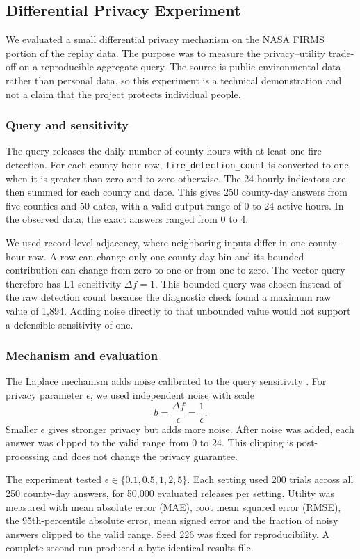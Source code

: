 \subsection{Differential Privacy Experiment}

We evaluated a small differential privacy mechanism on the NASA FIRMS portion of the replay data. The purpose was to measure the privacy--utility trade-off on a reproducible aggregate query. The source is public environmental data rather than personal data, so this experiment is a technical demonstration and not a claim that the project protects individual people.

\subsubsection{Query and sensitivity}
The query releases the daily number of county-hours with at least one fire detection. For each county-hour row, \texttt{fire\_detection\_count} is converted to one when it is greater than zero and to zero otherwise. The 24 hourly indicators are then summed for each county and date. This gives 250 county-day answers from five counties and 50 dates, with a valid output range of 0 to 24 active hours. In the observed data, the exact answers ranged from 0 to 4.

We used record-level adjacency, where neighboring inputs differ in one county-hour row. A row can change only one county-day bin and its bounded contribution can change from zero to one or from one to zero. The vector query therefore has L1 sensitivity $\Delta f=1$. This bounded query was chosen instead of the raw detection count because the diagnostic check found a maximum raw value of 1,894. Adding noise directly to that unbounded value would not support a defensible sensitivity of one.

\subsubsection{Mechanism and evaluation}
The Laplace mechanism adds noise calibrated to the query sensitivity \cite{dwork2006calibrating,dwork2014algorithmic}. For privacy parameter $\epsilon$, we used independent noise with scale
\[
b=\frac{\Delta f}{\epsilon}=\frac{1}{\epsilon}.
\]
Smaller $\epsilon$ gives stronger privacy but adds more noise. After noise was added, each answer was clipped to the valid range from 0 to 24. This clipping is post-processing and does not change the privacy guarantee.

The experiment tested $\epsilon\in\{0.1,0.5,1,2,5\}$. Each setting used 200 trials across all 250 county-day answers, for 50,000 evaluated releases per setting. Utility was measured with mean absolute error (MAE), root mean squared error (RMSE), the 95th-percentile absolute error, mean signed error and the fraction of noisy answers clipped to the valid range. Seed 226 was fixed for reproducibility. A complete second run produced a byte-identical results file.

